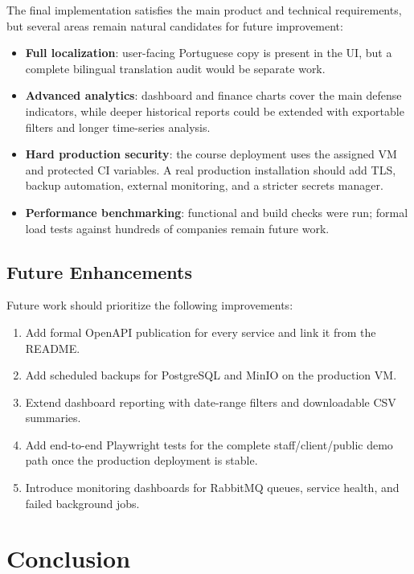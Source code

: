 \documentclass[12pt,a4paper]{report}
\begin{document}
The final implementation satisfies the main product and technical requirements,
but several areas remain natural candidates for future improvement:
\begin{itemize}
  \item \textbf{Full localization}: user-facing Portuguese copy is present in the
  UI, but a complete bilingual translation audit would be separate work.
  \item \textbf{Advanced analytics}: dashboard and finance charts cover the main
  defense indicators, while deeper historical reports could be extended with
  exportable filters and longer time-series analysis.
  \item \textbf{Hard production security}: the course deployment uses the assigned
  VM and protected CI variables. A real production installation should add TLS,
  backup automation, external monitoring, and a stricter secrets manager.
  \item \textbf{Performance benchmarking}: functional and build checks were run;
  formal load tests against hundreds of companies remain future work.
\end{itemize}

\section{Future Enhancements}
\label{sec:future-enhancements}

Future work should prioritize the following improvements:
\begin{enumerate}
  \item Add formal OpenAPI publication for every service and link it from the
  README.
  \item Add scheduled backups for PostgreSQL and MinIO on the production VM.
  \item Extend dashboard reporting with date-range filters and downloadable CSV
  summaries.
  \item Add end-to-end Playwright tests for the complete staff/client/public demo
  path once the production deployment is stable.
  \item Introduce monitoring dashboards for RabbitMQ queues, service health, and
  failed background jobs.
\end{enumerate}

\chapter{Conclusion}
\label{ch:conclusion}
\end{document}
